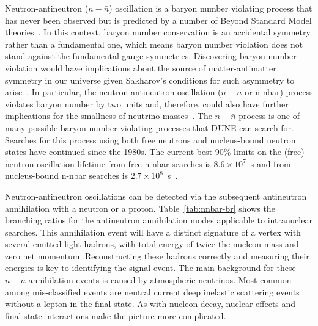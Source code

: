 Neutron-antineutron ($n - \bar{n}$) oscillation is a baryon number violating process that
has never been observed but is predicted by a number of Beyond Standard Model
theories~\cite{Phillips:2014fgb}. In this context, baryon number conservation is an accidental
symmetry rather than a fundamental one, which means baryon number violation
does not stand against the fundamental gauge symmetries. Discovering baryon
number violation would have implications about the source of matter-antimatter
symmetry in our universe given Sakharov's conditions for such asymmetry to arise~\cite{Sakharov:1967dj}.
In particular, the neutron-antineutron oscillation ($n-\bar{n}$ or n-nbar) process violates
baryon number by two units and, therefore, could also have further implications for
the smallness of neutrino masses~\cite{Phillips:2014fgb}. The $n - \bar{n}$ process is one of many possible baryon number violating processes that DUNE can search for. Searches for this process using
both free neutrons and nucleus-bound neutron states have continued 
since the 1980s. The current best 90\%  limits on the (free) neutron oscillation
lifetime from free n-nbar searches is $8.6\times10^7$~s and from nucleus-bound n-nbar searches is $2.7\times 10^8$~s~\cite{BaldoCeolin:1994jz,Abe:2011ky}.

Neutron-antineutron oscillations can be detected via the subsequent antineutron annihilation with a neutron or a proton. Table~\ref{tab:nnbar-br} shows the branching ratios for the antineutron annihilation modes applicable to intranuclear searches.  This annihilation event will have a distinct signature of a vertex with several emitted light hadrons, with total energy of twice the nucleon mass and zero net momentum. Reconstructing these hadrons correctly and measuring their energies is key to identifying the signal event. The main background for these $n - \bar{n}$ annihilation events is caused by atmospheric neutrinos. Most common among mis-classified events are neutral current deep inelastic scattering events without a lepton in the final state. As with nucleon decay, nuclear effects and final state interactions make the picture more complicated.


